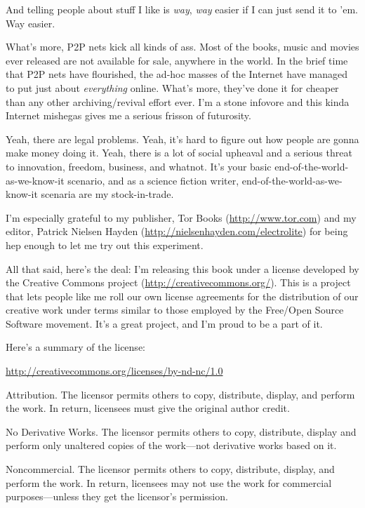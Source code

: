 And telling people about stuff I like is \emph{way}, \emph{way}
easier if I can just send it to 'em. Way easier.

What's more, P2P nets kick all kinds of ass. Most of the books,
music and movies ever released are not available for sale, anywhere
in the world. In the brief time that P2P nets have flourished, the
ad-hoc masses of the Internet have managed to put just about
\emph{everything} online. What's more, they've done it for cheaper
than any other archiving/revival effort ever. I'm a stone infovore
and this kinda Internet mishegas gives me a serious frisson of
futurosity.

Yeah, there are legal problems. Yeah, it's hard to figure out how
people are gonna make money doing it. Yeah, there is a lot of
social upheaval and a serious threat to innovation, freedom,
business, and whatnot. It's your basic
end-of-the-world-as-we-know-it scenario, and as a science fiction
writer, end-of-the-world-as-we-know-it scenaria are my
stock-in-trade.

I'm especially grateful to my publisher, Tor Books
(\href{http://www.tor.com/}{http://www.tor.com}) and my editor,
Patrick Nielsen Hayden
(\href{http://nielsenhayden.com/electrolite}{http://nielsenhayden.com/electrolite})
for being hep enough to let me try out this experiment.

All that said, here's the deal: I'm releasing this book under a
license developed by the Creative Commons project
(\href{http://creativecommons.org/}{http://creativecommons.org/}).
This is a project that lets people like me roll our own license
agreements for the distribution of our creative work under terms
similar to those employed by the Free/Open Source Software
movement. It's a great project, and I'm proud to be a part of it.

Here's a summary of the license:

\href{http://creativecommons.org/licenses/by-nd-nc/1.0}{http://creativecommons.org/licenses/by-nd-nc/1.0}

Attribution. The licensor permits others to copy, distribute,
display, and perform the work. In return, licensees must give the
original author credit.

No Derivative Works. The licensor permits others to copy,
distribute, display and perform only unaltered copies of the
work—not derivative works based on it.

Noncommercial. The licensor permits others to copy, distribute,
display, and perform the work. In return, licensees may not use the
work for commercial purposes—unless they get the licensor's
permission.

